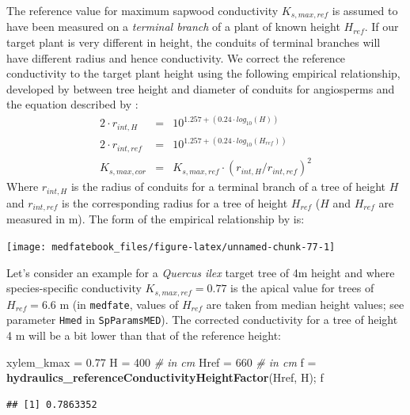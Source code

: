 \documentclass[]{book}
\newenvironment{Shaded}{\begin{snugshade}}{\end{snugshade}}
\newcommand{\KeywordTok}[1]{\textcolor[rgb]{0.13,0.29,0.53}{\textbf{#1}}}
\newcommand{\DecValTok}[1]{\textcolor[rgb]{0.00,0.00,0.81}{#1}}
\newcommand{\FloatTok}[1]{\textcolor[rgb]{0.00,0.00,0.81}{#1}}
\newcommand{\StringTok}[1]{\textcolor[rgb]{0.31,0.60,0.02}{#1}}
\newcommand{\CommentTok}[1]{\textcolor[rgb]{0.56,0.35,0.01}{\textit{#1}}}
\newcommand{\NormalTok}[1]{#1}
\begin{document}
The reference value for maximum sapwood conductivity \(K_{s,max,ref}\) is assumed to have been measured on a \emph{terminal branch} of a plant of known height \(H_{ref}\). If our target plant is very different in height, the conduits of terminal branches will have different radius and hence conductivity. We correct the reference conductivity to the target plant height using the following empirical relationship, developed by \citet{Olson2014} between tree height and diameter of conduits for angiosperms and the equation described by \citet{Christoffersen2016}:
\begin{eqnarray}
2 \cdot r_{int,H}&=& 10^{1.257+(0.24\cdot log_{10}(H))} \\
2 \cdot r_{int,ref}&=&10^{1.257+(0.24\cdot log_{10}(H_{ref}))}\\
K_{s,max,cor}&=&K_{s,max,ref}\cdot (r_{int,H}/r_{int,ref})^{2}
\end{eqnarray}
Where \(r_{int,H}\) is the radius of conduits for a terminal branch of a tree of height \(H\) and \(r_{int,ref}\) is the corresponding radius for a tree of height \(H_{ref}\) (\(H\) and \(H_{ref}\) are measured in m). The form of the empirical relationship by \citet{Olson2014} is:

\begin{center}\texttt{[image: medfatebook\_files/figure-latex/unnamed-chunk-77-1]} \end{center}

Let's consider an example for a \emph{Quercus ilex} target tree of 4m height and where species-specific conductivity \(K_{s,max,ref} = 0.77\) is the apical value for trees of \(H_{ref} = 6.6\) m (in \texttt{medfate}, values of \(H_{ref}\) are taken from median height values; see parameter \texttt{Hmed} in \texttt{SpParamsMED}). The corrected conductivity for a tree of height 4 m will be a bit lower than that of the reference height:

\begin{Shaded}
\begin{Highlighting}[]
\NormalTok{xylem_kmax =}\StringTok{ }\FloatTok{0.77}
\NormalTok{H =}\StringTok{ }\DecValTok{400} \CommentTok{# in cm}
\NormalTok{Href =}\StringTok{ }\DecValTok{660} \CommentTok{# in cm}
\NormalTok{f =}\StringTok{ }\KeywordTok{hydraulics_referenceConductivityHeightFactor}\NormalTok{(Href, H);}
\NormalTok{f}
\end{Highlighting}
\end{Shaded}

\begin{verbatim}
## [1] 0.7863352
\end{verbatim}
\end{document}
